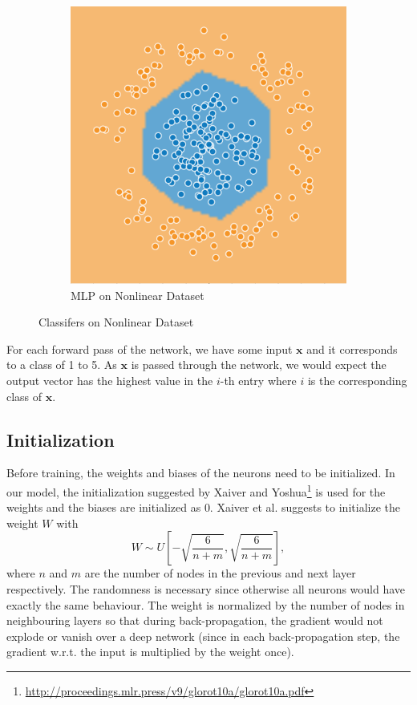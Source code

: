 \documentclass[12pt]{article}
\theoremstyle{remark}
\newcommand{\mat}[1]{\mathbf{#1}}
\begin{document}
\begin{figure}[!h]
\begin{subfigure}[b]{0.4\textwidth}
		\includegraphics[width=\textwidth]{mlp-nonlinear}
		\caption{MLP on Nonlinear Dataset}
		\label{fig:mlp-nonlinear}
	\end{subfigure}
	\caption{Classifers on Nonlinear Dataset\protect\footnotemark}\label{fig:nonlinear-dataset}
\end{figure}

For each forward pass of the network, we have some input \(\mat x\) and it corresponds to a class of 1 to 5. As \(\mat x\) is passed through the network, we would expect the output vector has the highest value in the \(i\)-th entry where \(i\) is the corresponding class of \(\mat x\).

\subsection{Initialization}
Before training, the weights and biases of the neurons need to be initialized. In our model, the initialization suggested by Xaiver and Yoshua\footnote{\url{http://proceedings.mlr.press/v9/glorot10a/glorot10a.pdf}} is used for the weights and the biases are initialized as 0. Xaiver et al. suggests to initialize the weight \(W\) with \[
	W \sim U\left[-\sqrt{\frac{6}{n+m}}, \sqrt{\frac{6}{n+m}}\right],
\]
where \(n\) and \(m\) are the number of nodes in the previous and next layer respectively. The randomness is necessary since otherwise all neurons would have exactly the same behaviour. The weight is normalized by the number of nodes in neighbouring layers so that during back-propagation, the gradient would not explode or vanish over a deep network (since in each back-propagation step, the gradient w.r.t. the input is multiplied by the weight once).
\end{document}
